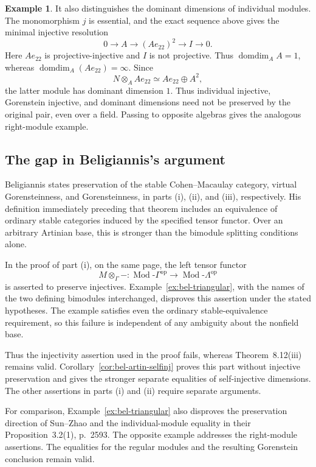 \documentclass[12pt,a4paper,english,reqno]{amsart}
\numberwithin{equation}{section}
\theoremstyle{plain}
\theoremstyle{definition}
\newtheorem{example}[theorem]{Example}
\begin{document}
\begin{example}
It also distinguishes the dominant dimensions of individual modules.
The monomorphism $j$ is essential, and the exact sequence above gives
the minimal injective resolution
\[
 0\longrightarrow A\longrightarrow (Ae_{22})^2
   \longrightarrow I\longrightarrow0 .
\]
Here $Ae_{22}$ is projective-injective and $I$ is not projective.
Thus $\operatorname{domdim}_A A=1$, whereas
$\operatorname{domdim}_A(Ae_{22})=\infty$.  Since
\[
 N\otimes_A Ae_{22}\simeq Ae_{22}\oplus A^2,
\]
the latter module has dominant dimension $1$.  Thus individual
injective, Gorenstein injective, and dominant dimensions need not be
preserved by the original pair, even over a field.
Passing to opposite algebras gives the analogous right-module example.
\end{example}

\subsection{The gap in Beligiannis's argument}

Beligiannis \cite[Theorem~8.12, p.~192]{bel-Beligiannis2005} states
preservation of the stable Cohen--Macaulay category, virtual
Gorensteinness, and Gorensteinness, in parts (i), (ii), and (iii),
respectively.  His definition immediately preceding that theorem
includes an equivalence of ordinary stable categories induced by the
specified tensor functor.  Over an arbitrary Artinian base, this is
stronger than the bimodule splitting conditions alone.

In the proof of part (i), on the same page, the left tensor functor
\[
 M\otimes_\Gamma-\colon
 \operatorname{Mod}\text{-}\Gamma^{\mathrm{op}}
 \longrightarrow
 \operatorname{Mod}\text{-}\Lambda^{\mathrm{op}}
\]
is asserted to preserve injectives.  Example~\ref{ex:bel-triangular},
with the names of the two defining bimodules interchanged, disproves
this assertion under the stated hypotheses.  The example satisfies
even the ordinary stable-equivalence requirement, so this failure is
independent of any ambiguity about the nonfield base.

Thus the injectivity assertion used in the proof fails, whereas
Theorem~8.12(iii) remains valid.  Corollary~\ref{cor:bel-artin-selfinj}
proves this part without injective preservation and gives the stronger
separate equalities of self-injective dimensions.  The other assertions
in parts (i) and (ii) require separate arguments.

For comparison, Example~\ref{ex:bel-triangular} also disproves the
preservation direction of Sun--Zhao
\cite[Lemma~3.1(1), pp.~2592--2593]{bel-SunZhao2025} and the
individual-module equality in their Proposition~3.2(1), p.~2593.
The opposite example addresses the right-module assertions.
The equalities for the regular modules and the resulting Gorenstein
conclusion remain valid.
\end{document}
